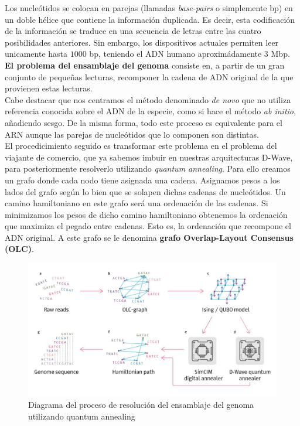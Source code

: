 \documentclass[11pt]{article}
\begin{document}
Los nucleótidos se colocan en parejas (llamadas \emph{base-pairs} o simplemente bp) en un doble hélice que contiene la información duplicada. Es decir, esta codificación de la información se traduce en una secuencia de letras entre las cuatro posibilidades anteriores. Sin embargo, los dispositivos actuales permiten leer unicamente hasta $1000$ bp, teniendo el ADN humano aproximádamente 3 Mbp. \\

\textbf{El problema del ensamblaje del genoma} consiste en, a partir de un gran conjunto de pequeñas lecturas, recomponer la cadena de ADN original de la que provienen estas lecturas. \\

Cabe destacar que nos centramos el método denominado \emph{de novo} que no utiliza referencia conocida sobre el ADN de la especie, como si hace el método \emph{ab initio}, añadiendo sesgo. De la misma forma, todo este proceso es equivalente para el ARN aunque las parejas de nucleótidos que lo componen son distintas. \\

El procedicimiento seguido es transformar este problema en el problema del viajante de comercio, que ya sabemos imbuir en nuestras arquitecturas D-Wave, para posteriormente resolverlo utilizando \emph{quantum annealing}. Para ello creamos un grafo donde cada nodo tiene asignada una cadena. Asignamos pesos a los lados del grafo según lo bien que se solapen dichas cadenas de nucleótidos. Un camino hamiltoniano en este grafo será una ordenación de las cadenas. Si minimizamos los pesos de dicho camino hamiltoniano obtenemos la ordenación que maximiza el pegado entre cadenas. Esto es, la ordenación que recompone el ADN original. A este grafo se le denomina \textbf{grafo Overlap-Layout Consensus (OLC)}.\\

\begin{figure}[H]
	\includegraphics[scale=0.4]{figures/de-novo-process.png}
	\centering
	\caption{Diagrama del proceso de resolución del ensamblaje del genoma utilizando quantum annealing}
\end{figure}
\end{document}

